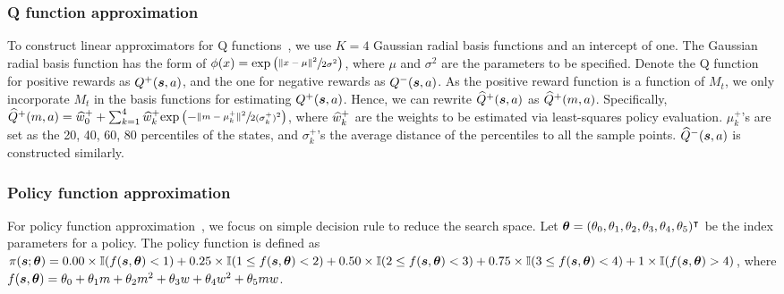 \subsubsection{Q function approximation}
To construct linear approximators for Q functions~\cite{Geramifard2013}, we use $K=4$ Gaussian radial basis functions and an intercept of one. The Gaussian radial basis function has the form of $\phi(x) = \exp\left(\sfrac{\| x - \mu\|^2}{2\sigma^2}\right)$, where $\mu$ and $\sigma^2$ are the parameters to be specified.  %
Denote the Q function for positive rewards as $Q^{+}(\boldsymbol{s}, a)$, and the one for negative rewards as  $Q^{-}(\boldsymbol{s}, a)$. %
As the positive reward function is a function of $M_t$, we only incorporate $M_t$ in the basis functions for estimating $Q^{+}(\boldsymbol{s}, a)$. Hence, we can rewrite $\widehat{Q}^{+}(\boldsymbol{s}, a)$ as $\widehat{Q}^{+}(m, a)$. Specifically, $\widehat{Q}^{+}(m, a) = \widehat{w}^{+}_0 + \sum_{k =1}^{4}\widehat{w}^{+}_{k}\text{exp}\left( - \sfrac{\| m - \mu^{+}_k \|^2}{2(\sigma^{+}_k)^2} \right)$, where $\widehat{w}^{+}_k$ are the weights to be estimated via least-squares policy evaluation. $\mu^{+}_{k}$'s are set as the 20, 40, 60, 80 percentiles of the states, and $\sigma^{+}_{k}$'s the average distance of the percentiles to all the sample points.  $\widehat{Q}^-(\boldsymbol{s}, a)$ is constructed similarly.

\subsubsection*{Policy function approximation}
For policy function approximation~\cite{Geramifard2013}, we focus on simple decision rule to reduce the search space. Let $\boldsymbol{\theta} = (\theta_0, \theta_1, \theta_2, \theta_3, \theta_4, \theta_5)^{\intercal}$ be the index parameters for a policy. The policy function is defined as $\pi(\boldsymbol{s}; \boldsymbol{\theta}) =  0.00 \times\mathbb{I}(f (\boldsymbol{s}, \boldsymbol{\theta} )  < 1 ) + 0.25 \times \mathbb{I}( 1 \le f (\boldsymbol{s}, \boldsymbol{\theta} )  < 2 ) +  0.50\times \mathbb{I}( 2 \le f (\boldsymbol{s}, \boldsymbol{\theta} ) < 3) + 0.75\times\mathbb{I}( 3 \le f( \boldsymbol{s}, \boldsymbol{\theta}) < 4) + 1\times \mathbb{I} ( f( \boldsymbol{s}, \boldsymbol{\theta}) > 4)$, where $f(\boldsymbol{s}, \boldsymbol{\theta} ) = \theta_0 + \theta_1  m + \theta_2  m^2 + \theta_3 w + \theta_4 w^2 + \theta_5  m  w $.

